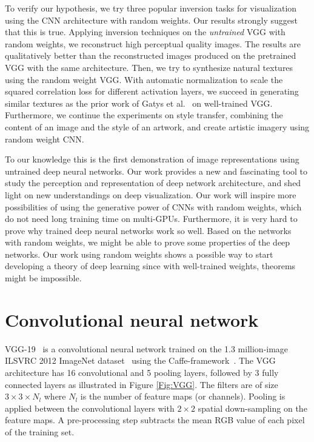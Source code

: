 \documentclass{article}
\begin{document}
To verify our hypothesis, we try three popular inversion tasks for visualization using the CNN architecture with random weights. Our results strongly suggest that this is true.
Applying inversion techniques on the \emph{untrained} VGG with random weights, we
 reconstruct high perceptual quality images. The results are qualitatively better than the reconstructed images produced on the pretrained VGG with the same architecture.
Then, we try to synthesize natural textures using the random weight VGG. With automatic normalization to scale the squared correlation loss for different activation layers, we succeed in generating similar textures as the prior work of Gatys et al.~\cite{Gatys2015texture} on well-trained VGG.
Furthermore, we continue the experiments on style transfer, combining the content of an image and the style of an artwork,
and create artistic imagery using random weight CNN.

To our knowledge this is the first demonstration of image representations using untrained deep neural networks.
 Our work  provides a new and fascinating tool to study the perception and representation of deep network architecture, and
shed light on new understandings on deep visualization. %
 Our work will inspire more possibilities of using the generative power of CNNs with random weights, which do not need long training time on multi-GPUs.
 Furthermore, it is very hard to prove why trained deep neural networks work so well.
 Based on the networks with random weights, we might be able to prove some properties of the deep networks.  Our work using random weights shows a possible way to start developing a theory of deep learning since with well-trained weights, theorems might be impossible.




\vspace{-0.5em}
\section{Convolutional neural network}
\label{sec:network}

VGG-19~\cite{Simonyan14VGG} is a convolutional neural network trained on the 1.3 million-image ILSVRC 2012 ImageNet dataset~\cite{ILSVRC} using the Caffe-framework~\cite{jia2014caffe}.
The VGG architecture has 16 convolutional and 5 pooling layers, followed by 3 fully connected layers as illustrated in Figure \ref{Fig:VGG}. The filters are of size $3 \times 3 \times N_l$  where $N_l$ is the number of feature maps (or channels). Pooling is applied between the convolutional layers with $2 \times 2$ spatial down-sampling on the feature maps.
A pre-processing step subtracts the mean RGB value of each pixel of the training set.%
\end{document}
